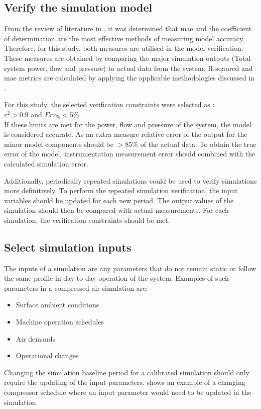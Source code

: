 	\subsection{Verify the simulation model}
	From the review of literature in , it was determined that \gls{mae} and the coefficient of determination are the most effective methods of measuring model accuracy. Therefore, for this study, both measures are utilised in the model verification. These measures are obtained by comparing the major simulation outputs (Total system power, flow and pressure) to actual data from the system. R-sqaured and \gls{mae} metrics are calculated by applying the applicable methodologies discussed in .	
	\par 
	For this study, the selected verification constraints were selected as : \\ {$r^2 > 0.9 $ and $ Err_{\%} < 5\% $}\\ If these limits are met for the power, flow and pressure of the system, the model is considered accurate. As an extra measure relative error of the output for the minor model components should be $ > 85\%$ of the actual data. To obtain the true error of the model, instrumentation measurement error should combined with the calculated simulation error.
	\par 
	Additionally, periodically repeated simulations could be used to verify simulations more definitively. To perform the repeated simulation verification, the input variables should be updated for each new period. The output values of the simulation should then be compared with actual measurements. For each simulation, the verification constraints should be met.
		
	\subsection{Select simulation inputs}
		The inputs of a simulation are any parameters that do not remain static or follow the same profile in day to day operation of the system. Examples of such parameters in a compressed air simulation are:
		\begin{itemize}
			\item Surface ambient conditions
			\item Machine operation schedules
			\item Air demands
			\item Operational changes
		\end{itemize} 
	Changing the simulation baseline period for a calibrated simulation should only require the updating of the input parameters.  shows an example of a changing compressor schedule where an input parameter would need to be updated in the simulation.	


